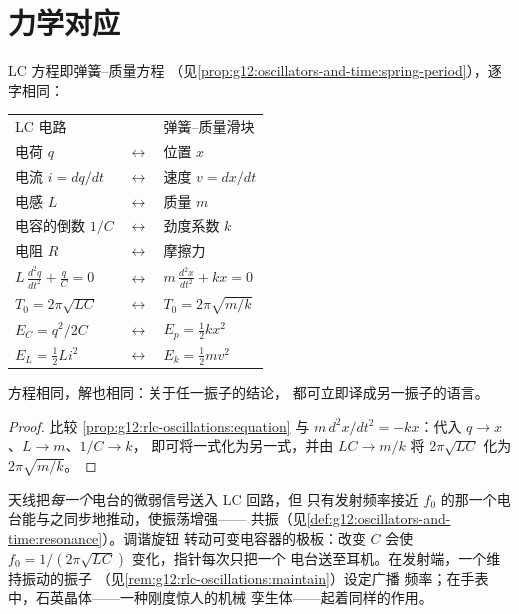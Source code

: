 \section{力学对应}

\begin{proposition}[电学–力学对照表]\label{prop:g12:rlc-oscillations:analogy}
LC 方程即弹簧–质量方程
（见\cref{prop:g12:oscillators-and-time:spring-period}），逐字相同：
\begin{center}\small
\begin{tabular}{lcl}
LC 电路 & & 弹簧–质量滑块 \\[2pt]
电荷 $q$ & $\longleftrightarrow$ & 位置 $x$\\
电流 $i = dq/dt$ & $\longleftrightarrow$ & 速度 $v = dx/dt$\\
电感 $L$ & $\longleftrightarrow$ & 质量 $m$\\
电容的倒数 $1/C$ & $\longleftrightarrow$ & 劲度系数 $k$\\
电阻 $R$ & $\longleftrightarrow$ & 摩擦力 \\
$L\,\frac{d^2q}{dt^2} + \frac{q}{C} = 0$ & $\longleftrightarrow$ &
  $m\,\frac{d^2x}{dt^2} + kx = 0$\\[2pt]
$T_0 = 2\pi\sqrt{LC}$ & $\longleftrightarrow$ &
  $T_0 = 2\pi\sqrt{m/k}$\\[2pt]
$E_C = q^2/2C$ & $\longleftrightarrow$ & $E_p = \tfrac12 kx^2$\\
$E_L = \tfrac12 Li^2$ & $\longleftrightarrow$ & $E_k = \tfrac12 mv^2$
\end{tabular}
\end{center}
方程相同，解也相同：关于任一振子的结论，
都可立即译成另一振子的语言。
\end{proposition}

\begin{proof}
比较 \cref{prop:g12:rlc-oscillations:equation} 与
$m\,d^2x/dt^2 = -kx$：代入 $q \to x$、$L \to m$、$1/C \to k$，
即可将一式化为另一式，并由 $LC \to m/k$ 将
$2\pi\sqrt{LC}$ 化为 $2\pi\sqrt{m/k}$。
\end{proof}

\begin{example}[调谐收音机]\label{ex:g12:rlc-oscillations:tuning}
天线把\emph{每一个}电台的微弱信号送入 LC 回路，但
只有发射频率接近 $f_0$ 的那一个电台能与之同步地推动，使振荡增强——
共振（见\cref{def:g12:oscillators-and-time:resonance}）。调谐旋钮
转动可变电容器的极板：改变 $C$ 会使
$f_0 = 1/(2\pi\sqrt{LC})$ 变化，指针每次只把一个
电台送至耳机。在发射端，一个维持振动的振子
（见\cref{rem:g12:rlc-oscillations:maintain}）设定广播
频率；在手表中，石英晶体——一种刚度惊人的机械
孪生体——起着同样的作用。
\end{example}

